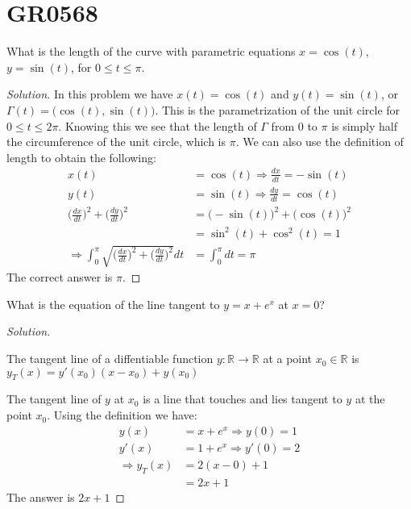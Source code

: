 \documentclass[crop=false,class=book,oneside]{standalone}
\begin{document}
\section{GR0568}
\begin{problem}
What is the length of the curve with parametric equations $x=\cos(t)$, $y=\sin(t)$, for $0\leq t \leq \pi$.
\end{problem}
\begin{proof}[Solution]
In this problem we have $x(t) = \cos(t)$ and $y(t) = \sin(t)$, or $\Gamma(t) = \big(\cos(t),\sin(t)\big)$. This is the parametrization of the unit circle for $0\leq t \leq 2\pi$. Knowing this we see that the length of $\Gamma$ from $0$ to $\pi$ is simply half the circumference of the unit circle, which is $\pi$. We can also use the definition of length to obtain the following:
\begin{align*}
    x(t)&=\cos(t)\Rightarrow\frac{dx}{dt}=-\sin(t)\\
    y(t)&=\sin(t)\Rightarrow\frac{dy}{dt}=\cos(t)\\
    \bigg(\frac{dx}{dt}\bigg)^{2}+\bigg(\frac{dy}{dt}\bigg)^{2}&=\big(-\sin(t)\big)^{2}+\big(\cos(t)\big)^{2}\\
    &=\sin^{2}(t)+\cos^{2}(t)=1\\
    \Rightarrow\int_{0}^{\pi}\sqrt{\bigg(\frac{dx}{dt}\bigg)^{2}+\bigg(\frac{dy}{dt}\bigg)^{2}}dt&=\int_{0}^{\pi}dt=\pi
\end{align*}
The correct answer is $\pi$.
\end{proof}
\begin{problem}
What is the equation of the line tangent to $y=x+e^x$ at $x=0$?
\end{problem}
\begin{proof}[Solution]
\begin{definition}
The tangent line of a diffentiable function $y:\mathbb{R}\rightarrow \mathbb{R}$ at a point $x_0\in \mathbb{R}$ is $y_T(x) = y'(x_0)(x-x_0) + y(x_0)$ 
\end{definition}
The tangent line of $y$ at $x_0$ is a line that touches and lies tangent to $y$ at the point $x_0$. Using the definition we have:
\begin{align*}
    y(x)&=x+e^{x}\Rightarrow y(0)=1\\
    y'(x)&=1+e^{x}\Rightarrow y'(0)=2\\
    \Rightarrow y_T(x)&=2(x-0)+1\\
    &=2x+1
\end{align*}
The answer is $2x+1$
\end{proof}
\end{document}
